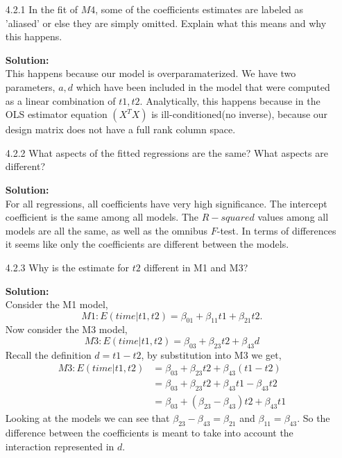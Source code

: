 \documentclass[12pt]{article}
\makeatletter
\theoremstyle{homework}
\newenvironment{exercise}[1]
{\def\@currentlabel{#1}\exercisecore}
{\endexercisecore}
\newcommand{\localhead}[1]{\par\smallskip\noindent\textbf{#1}\nobreak\\}%
\newcommand\solution{\localhead{Solution:}}
\makeatother
\begin{document}
\begin{exercise}{4.2}
\begin{enumerate}
    \item[4.2.1] In the fit of $M4$, some of the coefficients estimates are labeled as 'aliased' or else
    they are simply omitted. Explain what this means and why this happens.\\ 
    \solution This happens because our model is overparamaterized. We have two parameters, $a, d$ which have been 
    included in the model that were computed as a linear combination of $t1, t2$. Analytically, this happens because in 
    the OLS estimator equation $(X^TX)$ is ill-conditioned(no inverse), because our design matrix does not have a full rank column space.
    \newpage
    \item[4.2.2] What aspects of the fitted regressions are the same? What aspects are different?\\
    \solution For all regressions, all coefficients have very high significance. The intercept coefficient is the same among all models. The $R-squared$
    values among all models are all the same, as well as the omnibus $F$-test. In terms of differences it seems like only the coefficients are different between 
    the models.
    \newpage
    \item[4.2.3] Why is the estimate for $t2$ different in M1 and M3?\\
    \solution Consider the M1 model, 
    \begin{equation*}
    M1:E(time|t1,t2) = \beta_{01} + \beta_{11}t1 + \beta_{21}t2.
    \end{equation*}
    Now consider the M3 model, 
    \begin{equation*}
      M3:E(time|t1,t2) = \beta_{03} + \beta_{23}t2 + \beta_{43}d
    \end{equation*} 
    Recall the definition $d=t1-t2$, by substitution into M3 we get, 
    \begin{align*}
      M3:E(time|t1,t2) &= \beta_{03} + \beta_{23}t2 + \beta_{43}(t1 - t2)\\
      &= \beta_{03} + \beta_{23}t2 + \beta_{43}t1 - \beta_{43}t2\\
      &= \beta_{03} + (\beta_{23}-\beta_{43})t2 + \beta_{43}t1
    \end{align*} 
    Looking at the models we can see that $\beta_{23}-\beta_{43} = \beta_{21}$ and $\beta_{11} = \beta_{43}$. So the difference between the coefficients
    is meant to take into account the interaction represented in $d$.
     
  \end{enumerate}
\end{exercise}
 \newpage
\end{document}
